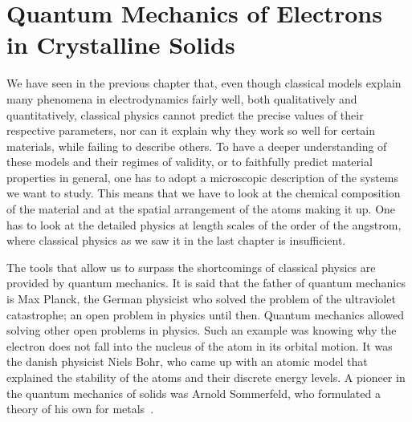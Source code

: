 


%
\chapter{Quantum Mechanics of Electrons in Crystalline Solids}
\label{ch:quantum_mechanics_solids}
\glsresetall
We have seen in the previous chapter that, even though classical models explain many phenomena in electrodynamics fairly well, both qualitatively and quantitatively, classical physics cannot predict the precise values of their respective parameters, nor can it explain why they work so well for certain materials, while failing to describe others.
To have a deeper understanding of these models and their regimes of validity, or to faithfully predict material properties in general, one has to adopt a microscopic description of the systems we want to study.
This means that we have to look at the chemical composition of the material and at the spatial arrangement of the atoms making it up.
One has to look at the detailed physics at length scales of the order of the angstrom, where classical physics as we saw it in the last chapter is insufficient.

The tools that allow us to surpass the shortcomings of classical physics are provided by quantum mechanics.
It is said that the father of quantum mechanics is Max Planck, the German physicist who solved the problem of the ultraviolet catastrophe; an open problem in physics until then.
Quantum mechanics allowed solving other open problems in physics.
Such an example was knowing why the electron does not fall into the nucleus of the atom in its orbital motion.
It was the danish physicist Niels Bohr, who came up with an atomic model that explained the stability of the atoms and their discrete energy levels.
A pioneer in the quantum mechanics of solids was Arnold Sommerfeld, who formulated a theory of his own for metals~\cite{Kondo_2012}.

